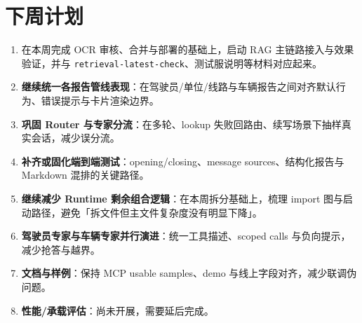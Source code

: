 \documentclass[UTF8]{ctexart}
\begin{document}
\section{下周计划}

\begin{enumerate}
\item 在本周完成 OCR 审核、合并与部署的基础上，启动 RAG 主链路接入与效果验证，并与 \texttt{retrieval-latest-check}、测试服说明等材料对应起来。
\item \textbf{继续统一各报告管线表现}：在驾驶员/单位/线路与车辆报告之间对齐默认行为、错误提示与卡片渲染边界。
\item \textbf{巩固 Router 与专家分流}：在多轮、lookup 失败回路由、续写场景下抽样真实会话，减少误分流。
\item \textbf{补齐或固化端到端测试}：opening/closing、message sources、结构化报告与 Markdown 混排的关键路径。
\item \textbf{继续减少 Runtime 剩余组合逻辑}：在本周拆分基础上，梳理 import 图与启动路径，避免「拆文件但主文件复杂度没有明显下降」。
\item \textbf{驾驶员专家与车辆专家并行演进}：统一工具描述、scoped calls 与负向提示，减少抢答与越界。
\item \textbf{文档与样例}：保持 MCP usable samples、demo 与线上字段对齐，减少联调伪问题。
\item \textbf{性能/承载评估}：尚未开展，需要延后完成。
\end{enumerate}
\end{document}
